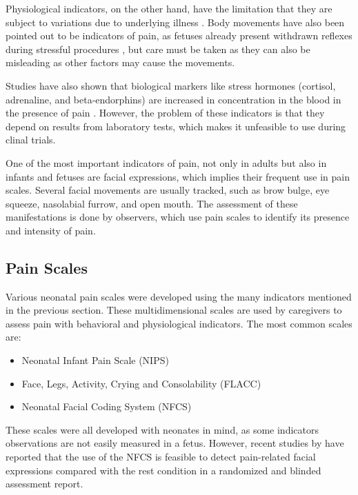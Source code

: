 Physiological indicators, on the other hand, have the limitation that they are subject to variations due to underlying illness \citep{sweet1998physiological}. Body movements have also been pointed out to be indicators of pain, as fetuses already present withdrawn reflexes during stressful procedures \citep{Zimmermann1991}, but care must be taken as they can also be misleading as other factors may cause the movements.

Studies have also shown that biological markers like stress hormones (cortisol, adrenaline, and beta-endorphins) are increased in concentration in the blood in the presence of pain \citep{giannakoulopoulos1994fetal}. However, the problem of these indicators is that they depend on results from laboratory tests, which makes it unfeasible to use during clinal trials.

One of the most important indicators of pain, not only in adults but also in infants and fetuses are facial expressions, which implies their frequent use in pain scales. Several facial movements are usually tracked, such as brow bulge, eye squeeze, nasolabial furrow, and open mouth. The assessment of these manifestations is done by observers, which use pain scales to identify its presence and intensity of pain. 


\subsection{Pain Scales}

Various neonatal pain scales were developed using the many indicators mentioned in the previous section. These multidimensional scales are used by caregivers to assess pain with behavioral and physiological indicators. The most common scales are:

\begin{itemize}
    \item Neonatal Infant Pain Scale (NIPS)
    \item Face, Legs, Activity, Crying and Consolability (FLACC)
    \item Neonatal Facial Coding System (NFCS)
\end{itemize}

These scales were all developed with neonates in mind, as some indicators observations are not easily measured in a fetus. However, recent studies by \citeauthor{bernardes2018feasibility} have reported that the use of the NFCS is feasible to detect pain-related facial expressions compared with the rest condition in a randomized and blinded assessment report.

